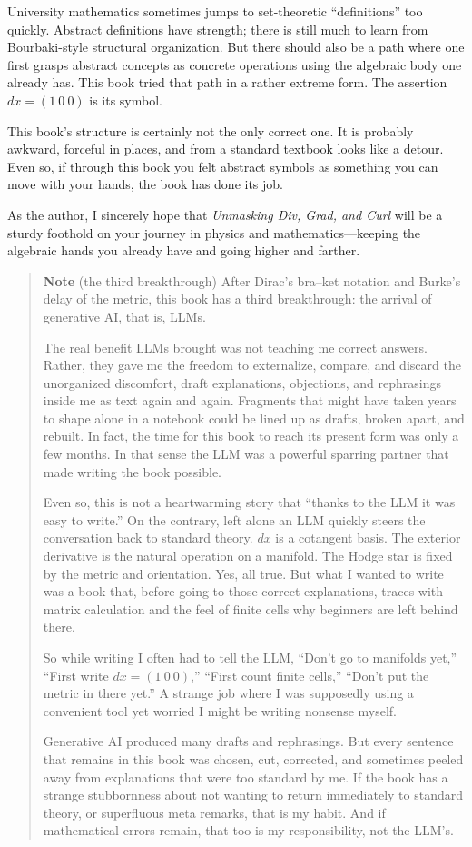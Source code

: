 University mathematics sometimes jumps to set-theoretic ``definitions''
too quickly. Abstract definitions have strength; there is still much to
learn from Bourbaki-style structural organization. But there should also
be a path where one first grasps abstract concepts as concrete
operations using the algebraic body one already has. This book tried
that path in a rather extreme form. The assertion \(dx=(1\ 0\ 0)\) is
its symbol.

This book's structure is certainly not the only correct one. It is
probably awkward, forceful in places, and from a standard textbook looks
like a detour. Even so, if through this book you felt abstract symbols
as something you can move with your hands, the book has done its job.

As the author, I sincerely hope that \emph{Unmasking Div, Grad, and
Curl} will be a sturdy foothold on your journey in physics and
mathematics---keeping the algebraic hands you already have and going
higher and farther.

\begin{quote}
\textbf{Note} (the third breakthrough) After Dirac's bra--ket notation
and Burke's delay of the metric, this book has a third breakthrough: the
arrival of generative AI, that is, LLMs.

The real benefit LLMs brought was not teaching me correct answers.
Rather, they gave me the freedom to externalize, compare, and discard
the unorganized discomfort, draft explanations, objections, and
rephrasings inside me as text again and again. Fragments that might have
taken years to shape alone in a notebook could be lined up as drafts,
broken apart, and rebuilt. In fact, the time for this book to reach its
present form was only a few months. In that sense the LLM was a powerful
sparring partner that made writing the book possible.

Even so, this is not a heartwarming story that ``thanks to the LLM it
was easy to write.'' On the contrary, left alone an LLM quickly steers
the conversation back to standard theory. \(dx\) is a cotangent basis.
The exterior derivative is the natural operation on a manifold. The
Hodge star is fixed by the metric and orientation. Yes, all true. But
what I wanted to write was a book that, before going to those correct
explanations, traces with matrix calculation and the feel of finite
cells why beginners are left behind there.

So while writing I often had to tell the LLM, ``Don't go to manifolds
yet,'' ``First write \(dx=(1\ 0\ 0)\),'' ``First count finite cells,''
``Don't put the metric in there yet.'' A strange job where I was
supposedly using a convenient tool yet worried I might be writing
nonsense myself.

Generative AI produced many drafts and rephrasings. But every sentence
that remains in this book was chosen, cut, corrected, and sometimes
peeled away from explanations that were too standard by me. If the book
has a strange stubbornness about not wanting to return immediately to
standard theory, or superfluous meta remarks, that is my habit. And if
mathematical errors remain, that too is my responsibility, not the
LLM's.
\end{quote}

